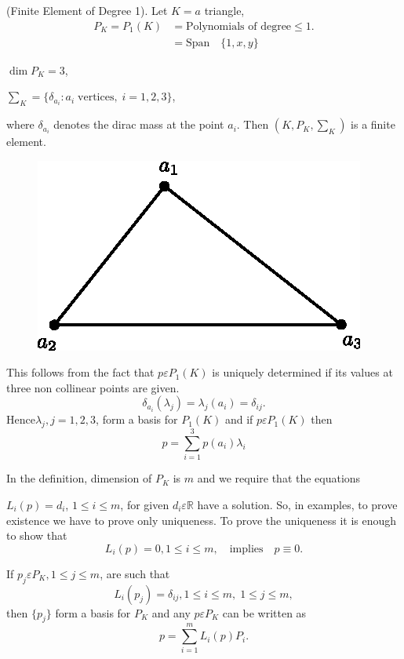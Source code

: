 \setcounter{exam}{0}
\begin{exam}\label{chap3:exm1}
(Finite Element of Degree 1). Let $K=a$ triangle,
\begin{align*}
P_K=P_1(K) &= \text{Polynomials of degree}\leq 1.\\
&= \text{Span}\quad\{1, x, y\}
\end{align*}

$\dim P_K=3$,

$\sum_K=\{\delta_{a_i}:a_i\;\text{vertices},\; i=1, 2, 3\}$,

\noindent where $\delta_{a_i}$ denotes the dirac mass at the point $a_i$. Then
$(K, P_K, \sum_K)$ is a finite element.
\begin{figure}[H]
\centering
\includegraphics{figure/fig3.3.eps}
\caption{}\label{fig3.3}
\end{figure}

This follows from the fact that $p\varepsilon P_1(K)$ is uniquely
determined if its values at three non collinear points are given.
$$
\delta_{a_i}(\lambda_j)=\lambda_j(a_i)=\delta_{ij}.
$$
Hence\pageoriginale $\lambda_j, j=1, 2, 3$, form a basis for $P_1(K)$
and if $p\varepsilon P_1(K)$ then 
$$
p=\sum\limits_{i=1}^3p(a_i)\lambda_i
$$
\end{exam}

\setcounter{REM}{0}
\begin{REM}\label{chap3:REM1}
In the definition, dimension of $P_K$ is $m$ and we require that the
equations

$L_i(p)=d_i$, $1\leq i \leq m$, for given $d_i\varepsilon\mathbb{R}$
have a solution. So, in examples, to prove existence we have to prove
only uniqueness. To prove the uniqueness it is enough to show that 
$$
L_i(p)=0, 1\leq i\leq m,\quad\text{implies}\quad p\equiv0.
$$
\end{REM}

\begin{REM}\label{chap3:REM2}
If $p_j\varepsilon P_K, 1\leq j\leq m$, are such that 
$$
L_i(p_j)=\delta_{ij}, 1\leq i\leq m, \; 1\leq j\leq m,
$$
then $\{p_j\}$ form a basis for $P_K$ and any $p\varepsilon P_K$ can
be written as 
$$
p=\sum\limits_{i=1}^m L_i(p)P_i.
$$
\end{REM}


